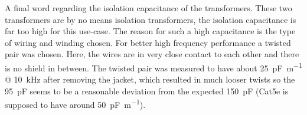 \documentclass[12pt]{book}
\begin{document}
A final word regarding the isolation capacitance of the transformers. These two transformers are by no means isolation transformers, the isolation capacitance is far too high for this use-case. The reason for such a high capacitance is the type of wiring and winding chosen. For better high frequency performance a twisted pair was chosen. Here, the wires are in very close contact to each other and there is no shield in between. The twisted pair was measured to have about \qty{25}{\pF \per \meter} @ \qty{10}{\kHz} after removing the jacket, which resulted in much looser twists so the \qty{95}{\pF} seems to be a reasonable deviation from the expected \qty{150}{\pF} (Cat5e is supposed to have around \qty{50}{\pF \per \m}).
\end{document}
